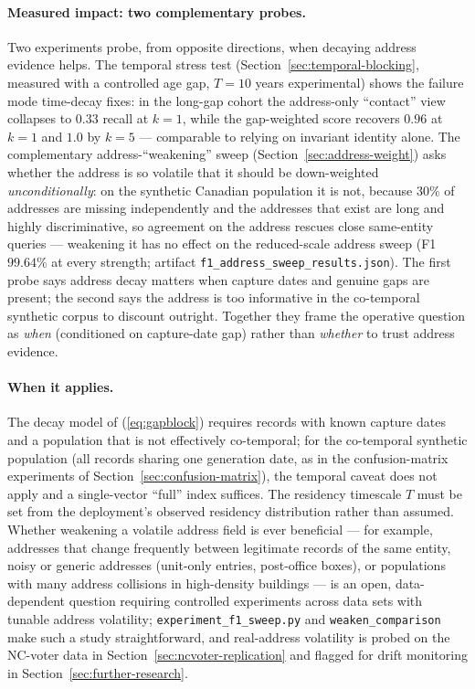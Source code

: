 \documentclass[11pt]{article}
\begin{document}
\paragraph{Measured impact: two complementary probes.}
Two experiments probe, from opposite directions, when decaying address evidence helps. The temporal stress test (Section~\ref{sec:temporal-blocking}, measured with a controlled age gap, $T{=}10$ years experimental) shows the failure mode time-decay fixes: in the long-gap cohort the address-only ``contact'' view collapses to $0.33$ recall at $k{=}1$, while the gap-weighted score recovers $0.96$ at $k{=}1$ and $1.0$ by $k{=}5$ --- comparable to relying on invariant identity alone. The complementary address-``weakening'' sweep (Section~\ref{sec:address-weight}) asks whether the address is so volatile that it should be down-weighted \emph{unconditionally}: on the synthetic Canadian population it is not, because $30\%$ of addresses are missing independently and the addresses that exist are long and highly discriminative, so agreement on the address rescues close same-entity queries --- weakening it has no effect on the reduced-scale address sweep (F1 $99.64\%$ at every strength; artifact \texttt{f1\_address\_sweep\_results.json}). The first probe says address decay matters when capture dates and genuine gaps are present; the second says the address is too informative in the co-temporal synthetic corpus to discount outright. Together they frame the operative question as \emph{when} (conditioned on capture-date gap) rather than \emph{whether} to trust address evidence.

\paragraph{When it applies.}
The decay model of (\ref{eq:gapblock}) requires records with known capture dates and a population that is not effectively co-temporal; for the co-temporal synthetic population (all records sharing one generation date, as in the confusion-matrix experiments of Section~\ref{sec:confusion-matrix}), the temporal caveat does not apply and a single-vector ``full'' index suffices. The residency timescale $T$ must be set from the deployment's observed residency distribution rather than assumed. Whether weakening a volatile address field is ever beneficial --- for example, addresses that change frequently between legitimate records of the same entity, noisy or generic addresses (unit-only entries, post-office boxes), or populations with many address collisions in high-density buildings --- is an open, data-dependent question requiring controlled experiments across data sets with tunable address volatility; \texttt{experiment\_f1\_sweep.py} and \texttt{weaken\_comparison} make such a study straightforward, and real-address volatility is probed on the NC-voter data in Section~\ref{sec:ncvoter-replication} and flagged for drift monitoring in Section~\ref{sec:further-research}.
\end{document}
